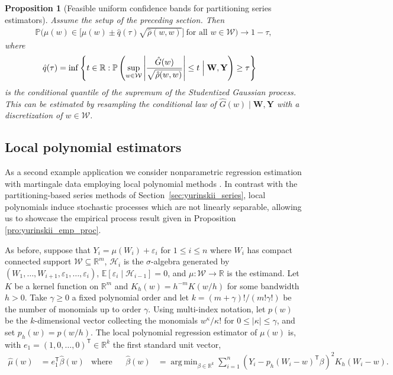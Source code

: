 \documentclass[11pt,lof]{puthesis}
\renewcommand{\P}{\ensuremath{\mathbb{P}}}
\newcommand{\R}{\ensuremath{\mathbb{R}}}
\newcommand{\E}{\ensuremath{\mathbb{E}}}
\newcommand{\bW}{\ensuremath{\mathbf{W}}}
\newcommand{\bY}{\ensuremath{\mathbf{Y}}}
\newcommand{\cH}{\ensuremath{\mathcal{H}}}
\newcommand{\cW}{\ensuremath{\mathcal{W}}}
\newcommand{\T}{\ensuremath{\mathsf{T}}}
\DeclareMathOperator*{\argmin}{arg\,min}
\theoremstyle{break}
\newtheorem{proposition}{Proposition}[section]
\theoremstyle{proof}
\begin{document}
\begin{proposition}[Feasible uniform confidence bands for partitioning
  series estimators]%
  \label{pro:yurinskii_series_feasible}
  Assume the setup of the preceding section. Then
  \begin{align*}
    \P\Big(
      \mu(w) \in
      \Big[
        \hat\mu(w) \pm \hat q(\tau)
        \sqrt{\hat\rho(w,w)}
      \Big]
      \ \text{for all }
    w \in \cW \Big)
    \to 1-\tau,
  \end{align*}
  where
  \begin{align*}
    \hat{q}(\tau)
    &=
    \inf
    \left\{
      t \in \R:
      \P\left(
        \sup_{w \in \cW}
        \left|
        \frac{\hat G(w)}{\sqrt{\hat\rho(w,w)}}
        \right|
        \leq t
        \Bigm| \bW, \bY
      \right)
      \geq \tau
    \right\}
  \end{align*}
  is the conditional quantile of the supremum of the Studentized Gaussian
  process. This can be estimated by resampling the conditional law of
  $\hat G(w) \mid \bW, \bY$ with a discretization of $w \in \cW$.
\end{proposition}

\subsection{Local polynomial estimators}
\label{sec:yurinskii_local_poly}

As a second example application we consider nonparametric regression estimation
with martingale data employing local polynomial methods
\citep{fan1996local}. In contrast with the partitioning-based series
methods of Section~\ref{sec:yurinskii_series}, local polynomials induce
stochastic
processes which are not linearly separable, allowing us to showcase the
empirical process result given in Proposition \ref{pro:yurinskii_emp_proc}.

As before, suppose that
$Y_i = \mu(W_i) + \varepsilon_i$
for $ 1 \leq i \leq n$
where $W_i$ has compact connected support $\cW \subseteq \R^m$,
$\cH_i$ is the $\sigma$-algebra generated by
$(W_1, \ldots, W_{i+1}, \varepsilon_1, \ldots, \varepsilon_i)$,
$\E[\varepsilon_i \mid \cH_{i-1}] = 0$,
and $\mu: \cW \to \R$ is the estimand. Let $K$ be a kernel function on $\R^m$
and $K_h(w) = h^{-m} K(w/h)$ for some bandwidth $h > 0$.
Take $\gamma \geq 0$ a fixed polynomial order and let
$k = (m+\gamma)!/(m!\gamma!)$ be the number of monomials up to order $\gamma$.
Using multi-index notation,
let $p(w)$ be the $k$-dimensional vector
collecting the monomials $w^{\kappa}/\kappa!$
for $0 \leq |\kappa| \leq \gamma$,
and set $p_h(w) = p(w/h)$.
The local polynomial regression estimator of $\mu(w)$ is,
with $e_1 = (1, 0, \ldots, 0)^\T \in \R^k$ the first standard unit vector,
%
\begin{align*}
  \hat{\mu}(w)
  &=
  e_1^\T\hat{\beta}(w)
  &\text{where} &
  &\hat{\beta}(w)
  &=
  \argmin_{\beta \in \R^{k}}
  \sum_{i=1}^n
  \left(Y_i - p_h(W_i-w)^\T \beta \right)^2
  K_h(W_i-w).
\end{align*}
\end{document}
